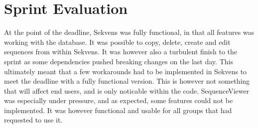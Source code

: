 \section{Sprint Evaluation}
At the point of the deadline, Sekvens was fully functional, in that all features was working with the database. It was possible to copy, delete, create and edit sequences from within Sekvens. It was however also a turbulent finish to the sprint as some dependencies pushed breaking changes on the last day. This ultimately meant that a few workarounds had to be implemented in Sekvens to meet the deadline with a fully functional version. This is however not something that will affect end users, and is only noticable within the code.
SequenceViewer was especially under pressure, and as expected, some features could not be implemented. It was however functional and usable for all groups that had requested to use it.